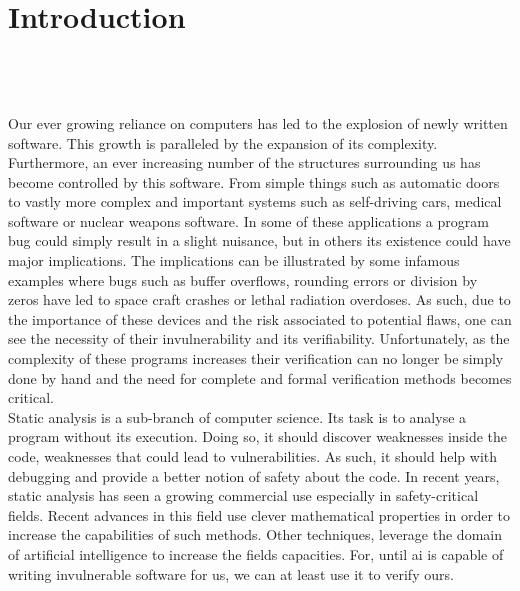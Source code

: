 
\setcounter{chapter}{0}

\chapter{Introduction}
\mbox{}\\
\mbox{}\\
\mbox{}\\
Our ever growing reliance on computers has led to the explosion of newly written software. This growth is paralleled by the expansion of its complexity. Furthermore, an ever increasing number of the structures surrounding us has become controlled by this software. From simple things such as automatic doors to vastly more complex and important systems such as self-driving cars, medical software or nuclear weapons software. In some of these applications a program bug could simply result in a slight nuisance, but in others its existence could have major implications. The implications can be illustrated by some infamous examples where bugs such as buffer overflows, rounding errors or division by zeros have led to space craft crashes or lethal radiation overdoses. As such, due to the importance of these devices and the risk associated to potential flaws, one can see the necessity of their invulnerability and its verifiability. Unfortunately, as the complexity of these programs increases their verification can no longer be simply done by hand and the need for complete and formal verification methods becomes critical.\\
Static analysis is a sub-branch of computer science. Its task is to analyse a program without its execution. Doing so, it should discover weaknesses inside the code, weaknesses that could lead to vulnerabilities. As such, it should help with debugging and provide a better notion of safety about the code. In recent years, static analysis has seen a growing commercial use especially in safety-critical fields. Recent advances in this field use clever mathematical properties in order to increase the capabilities of such methods. Other techniques, leverage the domain of artificial intelligence to increase the fields capacities. For, until ai is capable of writing invulnerable software for us, we can at least use it to verify ours.
